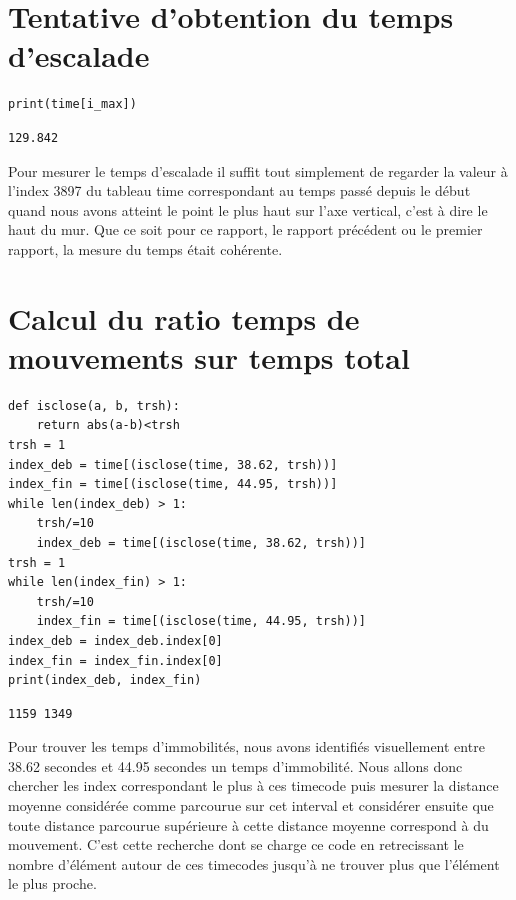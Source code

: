 \documentclass[11pt]{article}
\begin{document}
\begin{center}

\end{center}
\section{Tentative d'obtention du temps d'escalade}
\label{sec:org750e059}
\begin{verbatim}
print(time[i_max])
\end{verbatim}

\label{orgba51354}
\begin{verbatim}
129.842
\end{verbatim}


Pour mesurer le temps d'escalade il suffit tout simplement de regarder la valeur à l'index 3897 du tableau time correspondant au temps passé depuis le
début quand nous avons atteint le point le plus haut sur l'axe vertical, c'est à dire le haut du mur. Que ce soit pour ce rapport, le rapport
précédent ou le premier rapport, la mesure du temps était cohérente.
\section{Calcul du ratio temps de mouvements sur temps total}
\label{sec:orgb78f9d8}

\begin{verbatim}
def isclose(a, b, trsh):
    return abs(a-b)<trsh
trsh = 1
index_deb = time[(isclose(time, 38.62, trsh))]
index_fin = time[(isclose(time, 44.95, trsh))]
while len(index_deb) > 1:
    trsh/=10
    index_deb = time[(isclose(time, 38.62, trsh))]
trsh = 1
while len(index_fin) > 1:
    trsh/=10
    index_fin = time[(isclose(time, 44.95, trsh))]
index_deb = index_deb.index[0]
index_fin = index_fin.index[0]
print(index_deb, index_fin)
\end{verbatim}

\label{org5ce0578}
\begin{verbatim}
1159 1349
\end{verbatim}


Pour trouver les temps d'immobilités, nous avons identifiés visuellement entre 38.62 secondes et 44.95 secondes un temps d'immobilité. Nous allons
donc chercher les index correspondant le plus à ces timecode puis mesurer la distance moyenne considérée comme parcourue sur cet interval et
considérer ensuite que toute distance parcourue supérieure à cette distance moyenne correspond à du mouvement. C'est cette recherche dont se charge ce
code en retrecissant le nombre d'élément autour de ces timecodes jusqu'à ne trouver plus que l'élément le plus proche.
\end{document}
